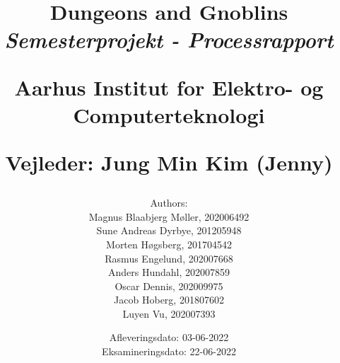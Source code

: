 \newcommand{\authorName}{}
\newcommand{\titleName}{Dungeons and Gnoblins}
\newcommand{\subject}{Semesterprojekt - Processrapport}
\newcommand{\vejleder}{Vejleder: Jung Min Kim (Jenny)}
\newcommand{\institute}{Aarhus Institut for Elektro- og Computerteknologi}
\begin{titlepage}
  \centering
    \title
    {
      \Huge \textbf{\titleName}\\
      \scale{\numberSQRTTWO}{\vspace{\sol pt}}
      \LARGE \textit{\subject}
      \scale{\numberSQRTTWO}{\rule{\linewidth}{\sol pt}}

      \textbf{\institute}

      \vejleder

      \author
    {
      \LARGE Authors: \\
      Magnus Blaabjerg Møller, 202006492 \\
      Sune Andreas Dyrbye, 201205948 \\
      Morten Høgsberg, 201704542 \\
      Rasmus Engelund, 202007668 \\
      Anders Hundahl, 202007859 \\
      Oscar Dennis, 202009975 \\
      Jacob Hoberg, 201807602 \\
      Luyen Vu, 202007393 \\
    }
      \date{
        \LARGE Afleveringsdato: 03-06-2022 \\
        \LARGE Eksamineringsdato: 22-06-2022
      }
    }
\end{titlepage}
